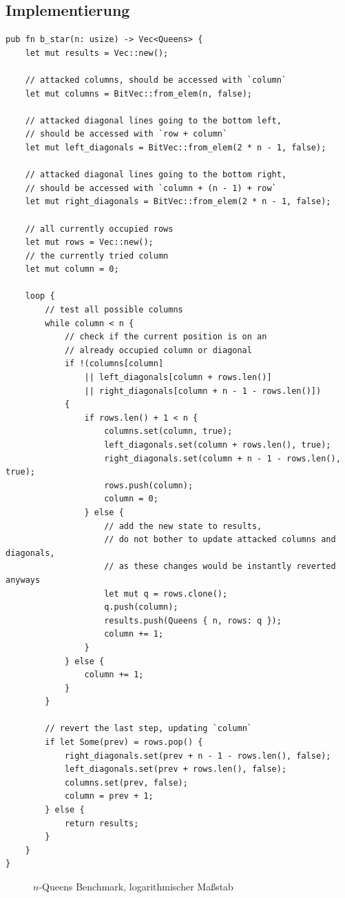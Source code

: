 \subsection{Implementierung}
\begin{verbatim}
pub fn b_star(n: usize) -> Vec<Queens> {
    let mut results = Vec::new();

    // attacked columns, should be accessed with `column`
    let mut columns = BitVec::from_elem(n, false);

    // attacked diagonal lines going to the bottom left,
    // should be accessed with `row + column`
    let mut left_diagonals = BitVec::from_elem(2 * n - 1, false);

    // attacked diagonal lines going to the bottom right,
    // should be accessed with `column + (n - 1) + row`
    let mut right_diagonals = BitVec::from_elem(2 * n - 1, false);

    // all currently occupied rows
    let mut rows = Vec::new();
    // the currently tried column
    let mut column = 0;

    loop {
        // test all possible columns
        while column < n {
            // check if the current position is on an
            // already occupied column or diagonal
            if !(columns[column]
                || left_diagonals[column + rows.len()]
                || right_diagonals[column + n - 1 - rows.len()])
            {
                if rows.len() + 1 < n {
                    columns.set(column, true);
                    left_diagonals.set(column + rows.len(), true);
                    right_diagonals.set(column + n - 1 - rows.len(), true);
                    rows.push(column);
                    column = 0;
                } else {
                    // add the new state to results,
                    // do not bother to update attacked columns and diagonals,
                    // as these changes would be instantly reverted anyways
                    let mut q = rows.clone();
                    q.push(column);
                    results.push(Queens { n, rows: q });
                    column += 1;
                }
            } else {
                column += 1;
            }
        }

        // revert the last step, updating `column`
        if let Some(prev) = rows.pop() {
            right_diagonals.set(prev + n - 1 - rows.len(), false);
            left_diagonals.set(prev + rows.len(), false);
            columns.set(prev, false);
            column = prev + 1;
        } else {
            return results;
        }
    }
}
\end{verbatim}
\begin{figure}
  \centering
  
  \caption{$n$-Queens Benchmark, logarithmischer Maßstab }
\end{figure}
